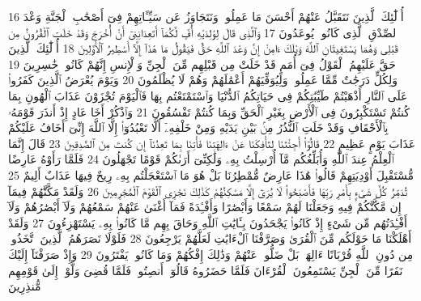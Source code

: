 {\tiny\colorbox{cl_aya}{16}} أُو۟لَٰٓئِكَ ٱلَّذِينَ نَتَقَبَّلُ عَنْهُمْ أَحْسَنَ مَا عَمِلُوا۟ وَنَتَجَاوَزُ عَن سَيِّـَٔاتِهِمْ فِىٓ أَصْحَٰبِ ٱلْجَنَّةِ وَعْدَ ٱلصِّدْقِ ٱلَّذِى كَانُوا۟ يُوعَدُونَ
{\tiny\colorbox{cl_aya}{17}} وَٱلَّذِى قَالَ لِوَٰلِدَيْهِ أُفٍّ لَّكُمَآ أَتَعِدَانِنِىٓ أَنْ أُخْرَجَ وَقَدْ خَلَتِ ٱلْقُرُونُ مِن قَبْلِى وَهُمَا يَسْتَغِيثَانِ ٱللَّهَ وَيْلَكَ ءَامِنْ إِنَّ وَعْدَ ٱللَّهِ حَقٌّ فَيَقُولُ مَا هَٰذَآ إِلَّآ أَسَٰطِيرُ ٱلْأَوَّلِينَ
{\tiny\colorbox{cl_aya}{18}} أُو۟لَٰٓئِكَ ٱلَّذِينَ حَقَّ عَلَيْهِمُ ٱلْقَوْلُ فِىٓ أُمَمٍ قَدْ خَلَتْ مِن قَبْلِهِم مِّنَ ٱلْجِنِّ وَٱلْإِنسِ إِنَّهُمْ كَانُوا۟ خَٰسِرِينَ
{\tiny\colorbox{cl_aya}{19}} وَلِكُلٍّ دَرَجَٰتٌ مِّمَّا عَمِلُوا۟ وَلِيُوَفِّيَهُمْ أَعْمَٰلَهُمْ وَهُمْ لَا يُظْلَمُونَ
{\tiny\colorbox{cl_aya}{20}} وَيَوْمَ يُعْرَضُ ٱلَّذِينَ كَفَرُوا۟ عَلَى ٱلنَّارِ أَذْهَبْتُمْ طَيِّبَٰتِكُمْ فِى حَيَاتِكُمُ ٱلدُّنْيَا وَٱسْتَمْتَعْتُم بِهَا فَٱلْيَوْمَ تُجْزَوْنَ عَذَابَ ٱلْهُونِ بِمَا كُنتُمْ تَسْتَكْبِرُونَ فِى ٱلْأَرْضِ بِغَيْرِ ٱلْحَقِّ وَبِمَا كُنتُمْ تَفْسُقُونَ
{\tiny\colorbox{cl_aya}{21}} وَٱذْكُرْ أَخَا عَادٍ إِذْ أَنذَرَ قَوْمَهُۥ بِٱلْأَحْقَافِ وَقَدْ خَلَتِ ٱلنُّذُرُ مِنۢ بَيْنِ يَدَيْهِ وَمِنْ خَلْفِهِۦٓ أَلَّا تَعْبُدُوٓا۟ إِلَّا ٱللَّهَ إِنِّىٓ أَخَافُ عَلَيْكُمْ عَذَابَ يَوْمٍ عَظِيمٍ
{\tiny\colorbox{cl_aya}{22}} قَالُوٓا۟ أَجِئْتَنَا لِتَأْفِكَنَا عَنْ ءَالِهَتِنَا فَأْتِنَا بِمَا تَعِدُنَآ إِن كُنتَ مِنَ ٱلصَّٰدِقِينَ
{\tiny\colorbox{cl_aya}{23}} قَالَ إِنَّمَا ٱلْعِلْمُ عِندَ ٱللَّهِ وَأُبَلِّغُكُم مَّآ أُرْسِلْتُ بِهِۦ وَلَٰكِنِّىٓ أَرَىٰكُمْ قَوْمًا تَجْهَلُونَ
{\tiny\colorbox{cl_aya}{24}} فَلَمَّا رَأَوْهُ عَارِضًا مُّسْتَقْبِلَ أَوْدِيَتِهِمْ قَالُوا۟ هَٰذَا عَارِضٌ مُّمْطِرُنَا بَلْ هُوَ مَا ٱسْتَعْجَلْتُم بِهِۦ رِيحٌ فِيهَا عَذَابٌ أَلِيمٌ
{\tiny\colorbox{cl_aya}{25}} تُدَمِّرُ كُلَّ شَىْءٍۭ بِأَمْرِ رَبِّهَا فَأَصْبَحُوا۟ لَا يُرَىٰٓ إِلَّا مَسَٰكِنُهُمْ كَذَٰلِكَ نَجْزِى ٱلْقَوْمَ ٱلْمُجْرِمِينَ
{\tiny\colorbox{cl_aya}{26}} وَلَقَدْ مَكَّنَّٰهُمْ فِيمَآ إِن مَّكَّنَّٰكُمْ فِيهِ وَجَعَلْنَا لَهُمْ سَمْعًا وَأَبْصَٰرًا وَأَفْـِٔدَةً فَمَآ أَغْنَىٰ عَنْهُمْ سَمْعُهُمْ وَلَآ أَبْصَٰرُهُمْ وَلَآ أَفْـِٔدَتُهُم مِّن شَىْءٍ إِذْ كَانُوا۟ يَجْحَدُونَ بِـَٔايَٰتِ ٱللَّهِ وَحَاقَ بِهِم مَّا كَانُوا۟ بِهِۦ يَسْتَهْزِءُونَ
{\tiny\colorbox{cl_aya}{27}} وَلَقَدْ أَهْلَكْنَا مَا حَوْلَكُم مِّنَ ٱلْقُرَىٰ وَصَرَّفْنَا ٱلْءَايَٰتِ لَعَلَّهُمْ يَرْجِعُونَ
{\tiny\colorbox{cl_aya}{28}} فَلَوْلَا نَصَرَهُمُ ٱلَّذِينَ ٱتَّخَذُوا۟ مِن دُونِ ٱللَّهِ قُرْبَانًا ءَالِهَةًۢ بَلْ ضَلُّوا۟ عَنْهُمْ وَذَٰلِكَ إِفْكُهُمْ وَمَا كَانُوا۟ يَفْتَرُونَ
{\tiny\colorbox{cl_aya}{29}} وَإِذْ صَرَفْنَآ إِلَيْكَ نَفَرًا مِّنَ ٱلْجِنِّ يَسْتَمِعُونَ ٱلْقُرْءَانَ فَلَمَّا حَضَرُوهُ قَالُوٓا۟ أَنصِتُوا۟ فَلَمَّا قُضِىَ وَلَّوْا۟ إِلَىٰ قَوْمِهِم مُّنذِرِينَ
